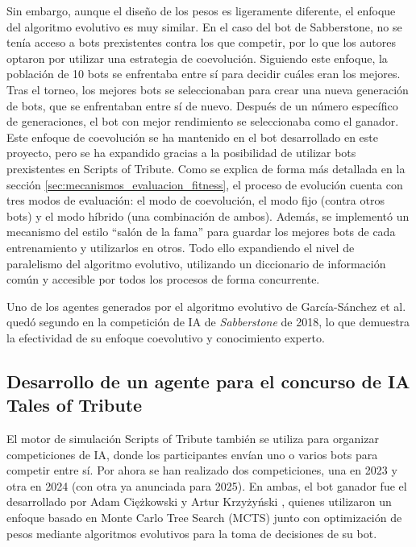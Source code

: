 Sin embargo, aunque el diseño de los pesos es ligeramente diferente, el enfoque del algoritmo evolutivo es muy similar. En el caso del bot de Sabberstone, no se tenía acceso a bots prexistentes contra los que competir, por lo que los autores optaron por utilizar una estrategia de coevolución. Siguiendo este enfoque, la población de 10 bots se enfrentaba entre sí para decidir cuáles eran los mejores. Tras el torneo, los mejores bots se seleccionaban para crear una nueva generación de bots, que se enfrentaban entre sí de nuevo. Después de un número específico de generaciones, el bot con mejor rendimiento se seleccionaba como el ganador. Este enfoque de coevolución se ha mantenido en el bot desarrollado en este proyecto, pero se ha expandido gracias a la posibilidad de utilizar bots prexistentes en Scripts of Tribute. Como se explica de forma más detallada en la sección \ref{sec:mecanismos_evaluacion_fitness}, el proceso de evolución cuenta con tres modos de evaluación: el modo de coevolución, el modo fijo (contra otros bots) y el modo híbrido (una combinación de ambos). Además, se implementó un mecanismo del estilo ``salón de la fama'' para guardar los mejores bots de cada entrenamiento y utilizarlos en otros. Todo ello expandiendo el nivel de paralelismo del algoritmo evolutivo, utilizando un diccionario de información común y accesible por todos los procesos de forma concurrente.

Uno de los agentes generados por el algoritmo evolutivo de García-Sánchez et al. quedó segundo en la competición de IA de \textit{Sabberstone} de 2018, lo que demuestra la efectividad de su enfoque coevolutivo y conocimiento experto.

\subsection{Desarrollo de un agente para el concurso de IA Tales of Tribute}


El motor de simulación Scripts of Tribute también se utiliza para organizar competiciones de IA, donde los participantes envían uno o varios bots para competir entre sí. Por ahora se han realizado dos competiciones, una en 2023 y otra en 2024 (con otra ya anunciada para 2025). En ambas, el bot ganador fue el desarrollado por Adam Ciężkowski y Artur Krzyżyński \cite{adam_ciezkowski_developing_2023}, quienes utilizaron un enfoque basado en Monte Carlo Tree Search (MCTS) junto con optimización de pesos mediante algoritmos evolutivos para la toma de decisiones de su bot. 

